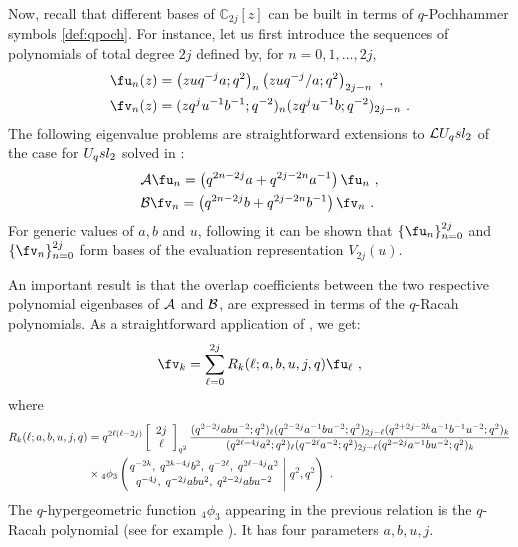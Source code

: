 \documentclass[11pt]{amsart}
\numberwithin{equation}{section}
\numberwithin{equation}{section}
\begin{document}
Now, recall that different  bases of $\mathbb{C}_{2j}[z]$ can be built in terms of $q$-Pochhammer symbols \eqref{def:qpoch}. For instance, let us first introduce the sequences of polynomials of total degree $2j$ defined by,  for $n=0,1,\dots, 2j$,
\begin{align}
\fu_n(z)&=\left(zuq^{-j}a;q^2\right)_{n}\left(zuq^{-j}/a;q^2\right)_{2j-n} \ ,\label{eq:un}\\
\fv_n(z)&=
    (zq^ju^{-1}b^{-1};q^{-2})_n(zq^ju^{-1}b;q^{-2})_{2j-n}\ .\label{eq:vn}
\end{align}
 The following  eigenvalue problems are straightforward extensions to $\mathcal{L} U_q sl_2$ of the case for $U_q sl_2$ solved in \cite[Sec.\,3.3.2]{WZ}:
    \begin{align}
     &   \mathcal{A} \fu_n=\left( q^{2n-2j}a+q^{2j-2n}a^{-1}\right) \fu_n\ , \label{eq:actA}\\
       &   \mathcal{B} \fv_{n}=\left( q^{2n-2j}b+q^{2j-2n}b^{-1} \right) \fv_{n}\ .\label{eq:actB}
    \end{align}
For generic values of $a,b$ and $u$, following \cite[Lem.\,3.1]{Ros07} it can be shown that $\{\fu_n\}_{n=0}^{2j}$ and $\{\fv_n\}_{n=0}^{2j}$  form bases of the evaluation representation $V_{2j}(u)$. 

An important result is that the overlap coefficients between the two respective polynomial eigenbases of ${\cal A}$ and ${\cal B}$, are expressed in terms of the $q$-Racah polynomials. As a straightforward application of  \cite[Eq.\,(2.16)]{Ros07}, we get:
\begin{align}
   \fv_{k}=\sum_{\ell=0}^{2j} R_k(\ell;a,b,u,j,q)  \fu_{\ell}\ ,\label{eq:overN1}
\end{align}
where
\begin{align}
    R_k(\ell;a,b,u,j,q) &= q^{2\ell(\ell-2j)}\left[\begin{array}{c}2j\\ \ell \end{array}\right]_{q^2}\frac{(q^{2-2j}abu^{-2};q^2)_\ell (q^{2-2j}a^{-1} b u^{-2};q^2)_{2j-\ell}(q^{2+2j-2k}a^{-1}b^{-1}u^{-2};q^2)_k  }
    {(q^{2\ell-4j}a^{2};q^2)_\ell (q^{-2\ell}a^{-2};q^2)_{2j-\ell}(q^{2-2j}a^{-1}bu^{-2};q^2)_k   }\nonumber\\
 &\times   {}_4\phi_3\left({{q^{-2k},\;q^{2k-4j}b^2, \;q^{-2\ell},\;q^{2\ell-4j}a^{2} }\atop
{q^{-4j},\;q^{-2j} ab u^2, \; q^{2-2j}abu^{-2} }}\;\Bigg\vert \; q^2,q^2\right)\ .\label{eq:Rac1}
\end{align}
The  $q$-hypergeometric function ${}_4\phi_3$ appearing in the previous relation is the $q$-Racah polynomial (see for example \cite{K10}). It has four parameters $a,b,u,j$.
\end{document}
